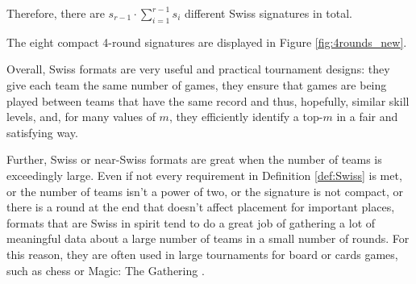 {{        Therefore, there are $s_{r-1} \cdot \sum_{i=1}^{r-1}s_i$ different Swiss signatures in total.
    }{}{\fried}

    The eight compact 4-round signatures are displayed in Figure \ref{fig:4rounds_new}.

    
    Overall, Swiss formats are very useful and practical tournament designs: they give each team the same number of games, they ensure that games are being played between teams that have the same record and thus, hopefully, similar skill levels, and, for many values of $m$, they efficiently identify a top-$m$ in a fair and satisfying way.

    Further, Swiss or near-Swiss formats are great when the number of teams is exceedingly large. Even if not every requirement in Definition \ref{def:Swiss} is met, or the number of teams isn't a power of two, or the signature is not compact, or there is a round at the end that doesn't affect placement for important places, formats that are Swiss in spirit tend to do a great job of gathering a lot of meaningful data about a large number of teams in a small number of rounds. For this reason, they are often used in large tournaments for board or cards games, such as chess or Magic: The Gathering \cite{ifno_mtg}.
}